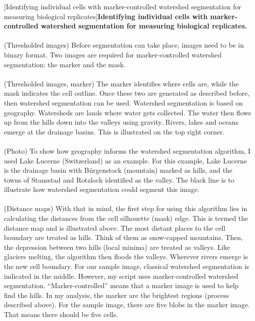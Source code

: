 \begin{centering}
\captionsetup{parbox=none}
[Identifying individual cells with marker-controlled watershed segmentation for measuring biological replicates]{\textbf{Identifying individual cells with marker-controlled watershed segmentation for measuring biological replicates.}
\\
\\
(Thresholded images) Before segmentation can take place, images need to be in binary format. Two images are required for marker-controlled watershed segmentation: the marker and the mask.
\\
\\
(Thresholded images, marker) The marker identifies where cells are, while the mask indicates the cell outline. Once these two are generated as described before, then watershed segmentation can be used. Watershed segmentation is based on geography. Watersheds are lands where water gets collected. The water then flows up from the hills down into the valleys using gravity. Rivers, lakes and oceans emerge at the drainage basins. This is illustrated on the top right corner.
\\
\\
(Photo) To show how geography informs the watershed segmentation algorithm, I used Lake Lucerne (Switzerland) as an example. For this example, Lake Lucerne is the drainage basin with Bürgenstock (mountain) marked as hills, and the towns of Stansstad and Rotzloch identified as the valley. The black line is to illustrate how watershed segmentation could segment this image.
\\
\\
(Distance maps) With that in mind, the first step for using this algorithm lies in calculating the distances from the cell silhouette (mask) edge. This is termed the distance map and is illustrated above. The most distant places to the cell boundary are treated as hills. Think of them as snow-capped mountains. Then, the depression between two hills (local minima) are treated as valleys. Like glaciers melting, the algorithm then floods the valleys. Wherever rivers emerge is the new cell boundary. For our sample image, classical watershed segmentation is indicated in the middle. However, my script uses marker-controlled watershed segmentation. “Marker-controlled” means that a marker image is used to help find the hills. In my analysis, the marker are the brightest regions (process described above). For the sample image, there are five blobs in the marker image. That means there should be five cells.
}
\end{centering}
